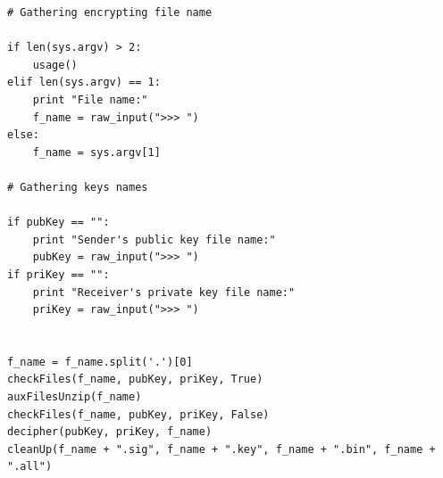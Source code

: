 \documentclass[a4paper,11pt,openright,oneside]{report}
\begin{document}
\begin{verbatim}
# Gathering encrypting file name

if len(sys.argv) > 2:
    usage()
elif len(sys.argv) == 1:
    print "File name:"
    f_name = raw_input(">>> ")
else:
    f_name = sys.argv[1]

# Gathering keys names

if pubKey == "":
    print "Sender's public key file name:"
    pubKey = raw_input(">>> ")
if priKey == "":
    print "Receiver's private key file name:"
    priKey = raw_input(">>> ")


f_name = f_name.split('.')[0]
checkFiles(f_name, pubKey, priKey, True)
auxFilesUnzip(f_name)
checkFiles(f_name, pubKey, priKey, False)
decipher(pubKey, priKey, f_name)
cleanUp(f_name + ".sig", f_name + ".key", f_name + ".bin", f_name + ".all")
\end{verbatim}

\maketitle
\nocite{*}
\printbibliography[title={Referências}]
\end{document}

